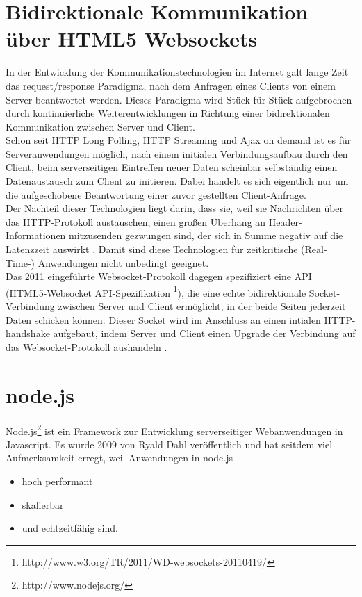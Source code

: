 \section{Bidirektionale Kommunikation über HTML5 Websockets}\label{s.Websockets}
In der Entwicklung der Kommunikationstechnologien im Internet galt lange Zeit das request/response Paradigma, nach dem Anfragen eines Clients von einem Server beantwortet werden. Dieses Paradigma wird Stück für Stück aufgebrochen durch kontinuierliche Weiterentwicklungen in Richtung einer bidirektionalen Kommunikation zwischen Server und Client.\\
Schon seit HTTP Long Polling, HTTP Streaming und Ajax on demand ist es für Serveranwendungen möglich, nach einem initialen Verbindungsaufbau durch den Client, beim serverseitigen Eintreffen neuer Daten scheinbar selbständig einen Datenaustausch zum Client zu initieren. Dabei handelt es sich eigentlich nur um die aufgeschobene Beantwortung einer zuvor gestellten Client-Anfrage.\\
Der Nachteil dieser Technologien liegt darin, dass sie, weil sie Nachrichten über das HTTP-Protokoll austauschen, einen großen Überhang an Header-Informationen mitzusenden gezwungen sind, der sich in Summe negativ auf die Latenzzeit auswirkt \cite{varaksin}. Damit sind diese Technologien für zeitkritische (Real-Time-) Anwendungen nicht unbedingt geeignet.
\\
Das 2011 eingeführte Websocket-Protokoll dagegen spezifiziert eine API (HTML5-Websocket API-Spezifikation \footnote{http://www.w3.org/TR/2011/WD-websockets-20110419/}), die eine echte bidirektionale Socket-Verbindung zwischen Server und Client ermöglicht, in der beide Seiten jederzeit Daten schicken können. Dieser Socket wird im Anschluss an einen intialen HTTP-handshake aufgebaut, indem Server und Client  einen Upgrade der Verbindung auf das Websocket-Protokoll aushandeln  \cite{html5rocks}. 

\section{node.js}\label{node.js}
Node.js\footnote{http://www.nodejs.org/} ist ein Framework zur Entwicklung serverseitiger Webanwendungen in Javascript. Es wurde 2009 von Ryald Dahl veröffentlich und hat seitdem viel Aufmerksamkeit erregt, weil Anwendungen in node.js
\begin{itemize}

\item hoch performant
\item skalierbar
\item und echtzeitfähig sind.
\end{itemize}

